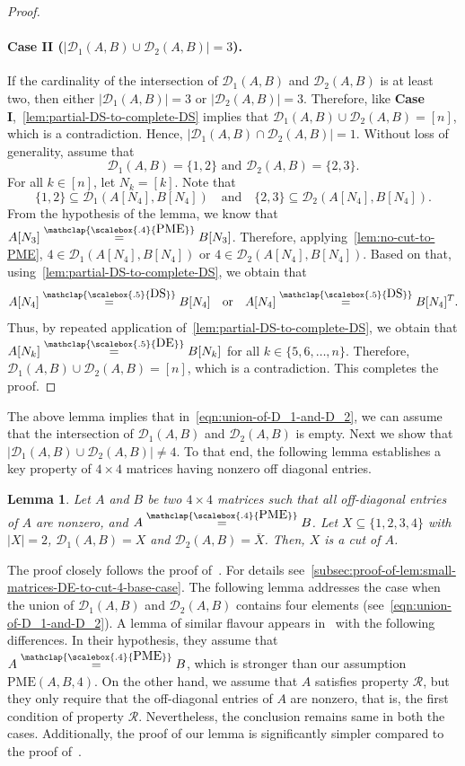 \documentclass[11pt,letterpaper]{article}
\newcommand{\comp}[1]{\overline{#1}}
\newtheorem{lemma}{Lemma}[section]
\newcommand{\DS}{\stackrel{\mathclap{\scalebox{.5}{\mbox{DS}}}}{=}}
\newcommand{\DE}{\stackrel{\mathclap{\scalebox{.5}{\mbox{DE}}}}{=}}
\newcommand{\PME}{\stackrel{\mathclap{\scalebox{.4}{\mbox{PME}}}}{=}}
\newcommand{\kPME}[3]{\mathrm{PME}(#1, #2, #3)}
\newcommand{\calD}{\mathcal{D}}
\newcommand{\prop}{\mathcal{R}}
\begin{document}
{{{\begin{proof}
\paragraph*{Case II ($|\calD_1\left(A, B\right)\cup \calD_2\left(A, B\right)|=3$).} If the cardinality of the intersection of $\calD_1(A,B)$ and $\calD_2(A, B)$ is at least two, then either $|\calD_1(A, B)|=3$ or $|\calD_2(A, B)|=3$. Therefore, like \textbf{Case I},~\cref{lem:partial-DS-to-complete-DS} implies that $\calD_1(A, B)\cup\calD_2(A, B)=[n]$, which is a contradiction. Hence, $|\calD_1(A, B)\cap \calD_2(A, B)|=1$. Without loss of generality, assume that $$\calD_1(A, B)=\{1,2\} \text{ and } \calD_2(A, B)=\{2, 3\}.$$ For all $k\in[n]$, let $N_k=[k]$. Note that $$\{1,2\}\subseteq \calD_1(A[N_4], B[N_4])\ \ \ \text{ and }\ \ \ \{2,3\}\subseteq \calD_2(A[N_4], B[N_4]).$$ From the hypothesis of the lemma, we know that $A[N_3]\PME B[N_3]$. Therefore, applying~\cref{lem:no-cut-to-PME}, $4\in\calD_1(A[N_4], B[N_4])$ or $4\in\calD_2(A[N_4], B[N_4])$. Based on that, using~\cref{lem:partial-DS-to-complete-DS}, we obtain that $$A[N_4]\DS B[N_4]\ \ \text{ or }\ \ A[N_4]\DS B[N_4]^T.$$ Thus, by repeated application of~\cref{lem:partial-DS-to-complete-DS}, we obtain that $A[N_k]\DE B[N_k]$ for all $k\in\{5,6, \ldots, n\}$. Therefore, $\calD_1(A, B)\cup\calD_2(A, B)=[n]$, which is a contradiction. This completes the proof.
\end{proof}

The above lemma implies that in~\cref{eqn:union-of-D_1-and-D_2}, we can assume that the intersection of $\calD_1(A, B)$ and $\calD_2(A, B)$ is empty. Next we show that $|\calD_1\left(A, B\right)\cup \calD_2\left(A, B\right)|\neq 4$. To that end, the following lemma establishes a key property of $4 \times 4$ matrices having nonzero off diagonal entries.

\begin{lemma}
\label{lem:small-matrices-DE-to-cut-4-base-case}
Let $A$ and $B$ be two $4\times 4$ matrices such that all off-diagonal entries of $A$ are nonzero, and $A\PME B$. Let $X\subseteq \{1,2,3,4\}$ with $|X|=2$, $\calD_1(A,B)=X$ and $\calD_2(A,B)=\comp{X}$. Then, $X$ is a cut of $A$.  
\end{lemma}
The proof closely follows the proof of~\cite[Theorem~4]{Hartfiell84}. For details see~\cref{subsec:proof-of-lem:small-matrices-DE-to-cut-4-base-case}. The following lemma addresses the case when the union of $\calD_1(A, B)$ and $\calD_2(A, B)$ contains four elements (see~\cref{eqn:union-of-D_1-and-D_2}). A lemma of similar flavour appears in~\cite[Theorem~2]{Loewy86} with the following differences. In their hypothesis, they assume that $A\PME B$, which is stronger than our assumption $\kPME{A}{B}{4}$. On the other hand, we assume that $A$ satisfies property $\prop$, but they only require that the off-diagonal entries of $A$ are nonzero, that is, the first condition of property $\prop$. Nevertheless, the conclusion remains same in both the cases. Additionally, the proof of our lemma is significantly simpler compared to the proof of~\cite[Theorem~2]{Loewy86}. 

}}}
\end{document}
